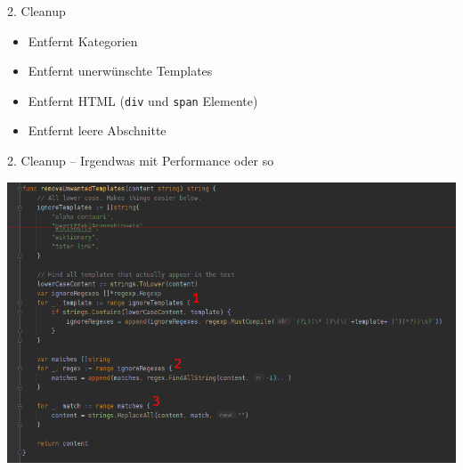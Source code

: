 \documentclass[9pt]{beamer}
\begin{document}
	\begin{frame}{2. Cleanup}
		\begin{itemize}
			\item Entfernt Kategorien
			\item Entfernt unerwünschte Templates
			\item Entfernt HTML (\texttt{div} und \texttt{span} Elemente)
			\item Entfernt leere Abschnitte
		\end{itemize}
	\end{frame}

	\begin{frame}{2. Cleanup -- Irgendwas mit Performance oder so}
		\begin{center}
			\includegraphics[width=\linewidth]{images/code-cleanup.png}
		\end{center}
	\end{frame}
\end{document}
